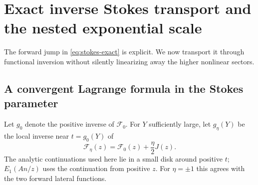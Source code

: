 \documentclass[11pt,a4paper]{article}
\numberwithin{equation}{section}
\theoremstyle{definition}\newtheorem{definition}[theorem]{Definition}
\theoremstyle{remark}\newtheorem{remark}[theorem]{Remark}
\newcommand{\F}{\mathcal F}\newcommand{\CC}{\mathcal C}
\begin{document}
\section{Exact inverse Stokes transport and the nested exponential scale}
\label{sec:inverse-stokes}
The forward jump in \eqref{eq:stokes-exact} is explicit. We now transport
it through functional inversion without silently linearizing away the
higher nonlinear sectors.

\subsection{A convergent Lagrange formula in the Stokes parameter}
Let $g_0$ denote the positive inverse of $\F_0$. For $Y$ sufficiently
large, let $g_\eta(Y)$ be the local inverse near $t=g_0(Y)$ of
\begin{equation}\label{eq:Feta}
 \F_\eta(z)=\F_0(z)+\frac\eta2J(z).
\end{equation}
The analytic continuations used here lie in a small disk around positive
$t$; $E_1(An/z)$ uses the continuation from positive $z$.
For $\eta=\pm1$ this agrees with the two forward lateral functions.
\end{document}

